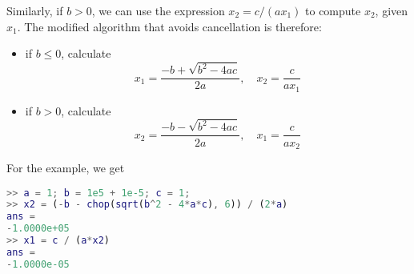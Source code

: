 \begin{example}
Similarly, if $ b>0 $, we can use the expression $ x_{2}=c /\left(a x_{1}\right) $ to compute $ x_{2} $, given $ x_{1} $. The modified algorithm that avoids cancellation is therefore:

\begin{itemize}
    \item if $ b \leq 0 $, calculate
\begin{equation}
x_{1}=\frac{-b+\sqrt{b^{2}-4 a c}}{2 a}, \quad x_{2}=\frac{c}{a x_{1}}
\end{equation}
    \item if $ b>0 $, calculate
\begin{equation}
x_{2}=\frac{-b-\sqrt{b^{2}-4 a c}}{2 a}, \quad x_{1}=\frac{c}{a x_{2}}
\end{equation}
\end{itemize}


For the example, we get

\begin{lstlisting}[caption=example 2 for cancellation,language=matlab]
>> a = 1; b = 1e5 + 1e-5; c = 1;
>> x2 = (-b - chop(sqrt(b^2 - 4*a*c), 6)) / (2*a)
ans =
-1.0000e+05
>> x1 = c / (a*x2)
ans =
-1.0000e-05
\end{lstlisting}


\end{example}

